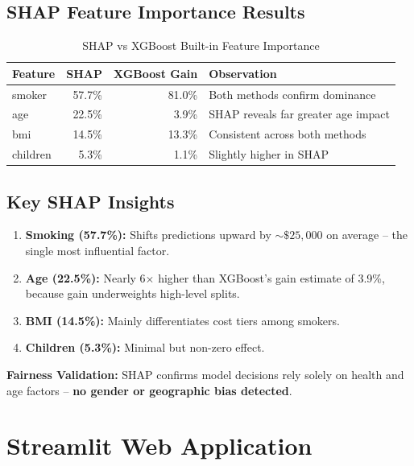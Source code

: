 \documentclass[12pt,a4paper]{report}
\begin{document}
\section{SHAP Feature Importance Results}

\begin{table}[H]
\centering
\caption{SHAP vs XGBoost Built-in Feature Importance}
\begin{tabular}{lrrl}
\toprule
\textbf{Feature} & \textbf{SHAP} & \textbf{XGBoost Gain} & \textbf{Observation} \\
\midrule
smoker   & 57.7\% & 81.0\% & Both methods confirm dominance \\
age      & 22.5\% &  3.9\% & SHAP reveals far greater age impact \\
bmi      & 14.5\% & 13.3\% & Consistent across both methods \\
children &  5.3\% &  1.1\% & Slightly higher in SHAP \\
\bottomrule
\end{tabular}
\end{table}

\section{Key SHAP Insights}

\begin{enumerate}
  \item \textbf{Smoking (57.7\%):} Shifts predictions upward by $\sim\$25{,}000$ on average -- the single most influential factor.
  \item \textbf{Age (22.5\%):} Nearly 6$\times$ higher than XGBoost's gain estimate of 3.9\%, because gain underweights high-level splits.
  \item \textbf{BMI (14.5\%):} Mainly differentiates cost tiers among smokers.
  \item \textbf{Children (5.3\%):} Minimal but non-zero effect.
\end{enumerate}

\begin{infobox}
\textbf{Fairness Validation:} SHAP confirms model decisions rely solely on health and age factors -- \textbf{no gender or geographic bias detected}.
\end{infobox}

\chapter{Streamlit Web Application}
\end{document}
